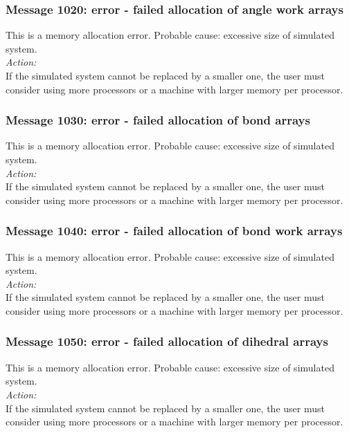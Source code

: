 \subsubsection*{Message 1020: error - failed allocation of angle work
arrays}

This is a memory allocation error. Probable cause: excessive size of
simulated system. \\

\noindent
{\em Action:}\\
If the simulated system cannot be replaced by a smaller one, the user
must consider using more processors or a machine with larger memory
per processor.

\subsubsection*{Message 1030: error - failed allocation of bond arrays}

This is a memory allocation error. Probable cause: excessive size of
simulated system. \\

\noindent
{\em Action:}\\
If the simulated system cannot be replaced by a smaller one, the user
must consider using more processors or a machine with larger memory
per processor.

\subsubsection*{Message 1040: error - failed allocation of bond work
arrays}

This is a memory allocation error. Probable cause: excessive size of
simulated system. \\

\noindent
{\em Action:}\\
If the simulated system cannot be replaced by a smaller one, the user
must consider using more processors or a machine with larger memory
per processor.

\subsubsection*{Message 1050: error - failed allocation of dihedral
arrays}

This is a memory allocation error. Probable cause: excessive size of
simulated system. \\

\noindent
{\em Action:}\\
If the simulated system cannot be replaced by a smaller one, the user
must consider using more processors or a machine with larger memory
per processor.

